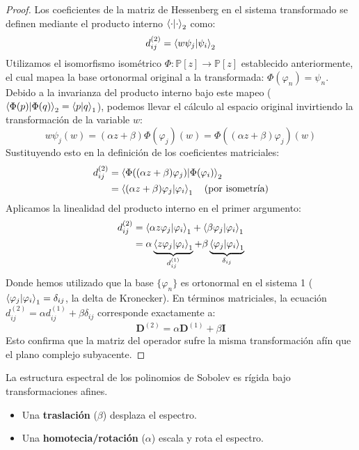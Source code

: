 \documentclass[12pt,a4paper]{article}
\newcommand{\Poly}{\mathbb{P}[z]}
\begin{document}
\begin{proof}
Los coeficientes de la matriz de Hessenberg en el sistema transformado se definen mediante el producto interno $\ip{\cdot}{\cdot}_2$ como:
$$ d_{ij}^{(2)} = \ip{w \psi_j}{\psi_i}_2 $$
Utilizamos el isomorfismo isométrico $\Phi: \Poly \to \Poly$ establecido anteriormente, el cual mapea la base ortonormal original a la transformada: $\Phi(\varphi_n) = \psi_n$. Debido a la invarianza del producto interno bajo este mapeo ($\ip{\Phi(p)}{\Phi(q)}_2 = \ip{p}{q}_1$), podemos llevar el cálculo al espacio original invirtiendo la transformación de la variable $w$:
$$ w \psi_j(w) = (\alpha z + \beta) \Phi(\varphi_j)(w) = \Phi( (\alpha z + \beta)\varphi_j )(w) $$
Sustituyendo esto en la definición de los coeficientes matriciales:
\begin{align*}
    d_{ij}^{(2)} &= \ip{\Phi( (\alpha z + \beta)\varphi_j )}{\Phi(\varphi_i)}_2 \\
    &= \ip{(\alpha z + \beta)\varphi_j}{\varphi_i}_1 \quad (\text{por isometría})
\end{align*}
Aplicamos la linealidad del producto interno en el primer argumento:
\begin{align*}
    d_{ij}^{(2)} &= \ip{\alpha z \varphi_j}{\varphi_i}_1 + \ip{\beta \varphi_j}{\varphi_i}_1 \\
    &= \alpha \underbrace{\ip{z \varphi_j}{\varphi_i}_1}_{d_{ij}^{(1)}} + \beta \underbrace{\ip{\varphi_j}{\varphi_i}_1}_{\delta_{ij}}
\end{align*}
Donde hemos utilizado que la base $\{\varphi_n\}$ es ortonormal en el sistema 1 ($\ip{\varphi_j}{\varphi_i}_1 = \delta_{ij}$, la delta de Kronecker).
En términos matriciales, la ecuación $d_{ij}^{(2)} = \alpha d_{ij}^{(1)} + \beta \delta_{ij}$ corresponde exactamente a:
$$ \mathbf{D}^{(2)} = \alpha \mathbf{D}^{(1)} + \beta \mathbf{I} $$
Esto confirma que la matriz del operador sufre la misma transformación afín que el plano complejo subyacente.
\end{proof}

La estructura espectral de los polinomios de Sobolev es rígida bajo transformaciones afines.
\begin{itemize}
    \item Una \textbf{traslación} ($\beta$) desplaza el espectro.
    \item Una \textbf{homotecia/rotación} ($\alpha$) escala y rota el espectro.
\end{itemize}
\end{document}
